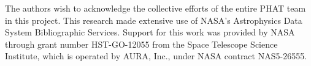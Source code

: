 \documentclass{emulateapj}
\begin{document}
\acknowledgements


{The authors wish to acknowledge the collective efforts of the entire PHAT team in this project.  This research made extensive use of NASA's Astrophysics Data System Bibliographic Services.  Support for this work was provided by NASA through grant number HST-GO-12055 from the Space Telescope Science Institute, which is operated by AURA, Inc., under NASA contract NAS5-26555.}



  

\end{document}
